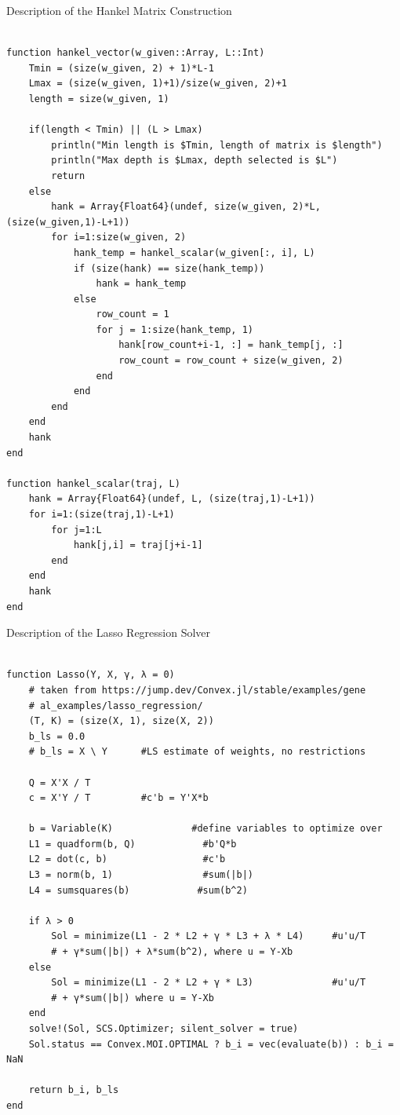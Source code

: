 \begin{listing}[h]
\caption{Description of the Hankel Matrix Construction}
\label{lst: hank}
\begin{verbatim}

function hankel_vector(w_given::Array, L::Int) 
    Tmin = (size(w_given, 2) + 1)*L-1
    Lmax = (size(w_given, 1)+1)/size(w_given, 2)+1
    length = size(w_given, 1)

    if(length < Tmin) || (L > Lmax)
        println("Min length is $Tmin, length of matrix is $length")
        println("Max depth is $Lmax, depth selected is $L")
        return 
    else
        hank = Array{Float64}(undef, size(w_given, 2)*L, (size(w_given,1)-L+1))
        for i=1:size(w_given, 2)
            hank_temp = hankel_scalar(w_given[:, i], L)
            if (size(hank) == size(hank_temp))
                hank = hank_temp
            else
                row_count = 1
                for j = 1:size(hank_temp, 1)
                    hank[row_count+i-1, :] = hank_temp[j, :]
                    row_count = row_count + size(w_given, 2)
                end
            end
        end
    end
    hank
end

function hankel_scalar(traj, L)
    hank = Array{Float64}(undef, L, (size(traj,1)-L+1))
    for i=1:(size(traj,1)-L+1)
        for j=1:L
            hank[j,i] = traj[j+i-1]
        end   
    end
    hank
end

\end{verbatim}
\end{listing}

\begin{listing}[h]
\caption{Description of the Lasso Regression Solver}
\label{lst: lasso}
\begin{verbatim}

function Lasso(Y, X, γ, λ = 0)  
    # taken from https://jump.dev/Convex.jl/stable/examples/gene
    # al_examples/lasso_regression/
    (T, K) = (size(X, 1), size(X, 2))
    b_ls = 0.0
    # b_ls = X \ Y      #LS estimate of weights, no restrictions

    Q = X'X / T
    c = X'Y / T         #c'b = Y'X*b

    b = Variable(K)              #define variables to optimize over
    L1 = quadform(b, Q)            #b'Q*b
    L2 = dot(c, b)                 #c'b
    L3 = norm(b, 1)                #sum(|b|)
    L4 = sumsquares(b)            #sum(b^2)

    if λ > 0
        Sol = minimize(L1 - 2 * L2 + γ * L3 + λ * L4)     #u'u/T
        # + γ*sum(|b|) + λ*sum(b^2), where u = Y-Xb
    else
        Sol = minimize(L1 - 2 * L2 + γ * L3)              #u'u/T
        # + γ*sum(|b|) where u = Y-Xb
    end
    solve!(Sol, SCS.Optimizer; silent_solver = true)
    Sol.status == Convex.MOI.OPTIMAL ? b_i = vec(evaluate(b)) : b_i = NaN

    return b_i, b_ls
end 
              
\end{verbatim}
\end{listing}


